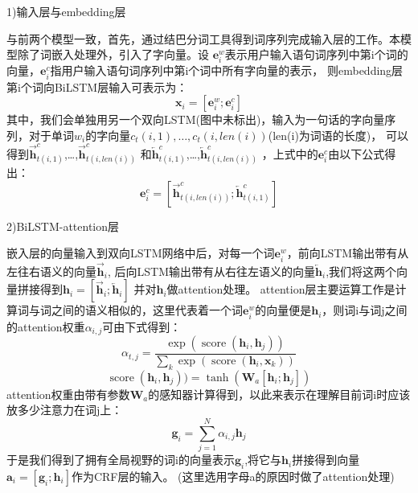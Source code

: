 1)输入层与embedding层

与前两个模型一致，首先，通过结巴分词工具得到词序列完成输入层的工作。本模型除了词嵌入处理外，引入了字向量。设
$\mathbf{e}_{i}^{w}$表示用户输入语句词序列中第i个词的向量，$\mathbf{e}_{i}^{c}$指用户输入语句词序列中第i个词中所有字向量的表示，
则embedding层第i个词向BiLSTM层输入可表示为：
\begin{equation}
  \mathbf{x}_{i}=[\mathbf{e}_{i}^{w} ;\mathbf{e}_{i}^{c}]
\end{equation}
其中，我们会单独用另一个双向LSTM(图中未标出)，输入为一句话的字向量序列，对于单词$w_i$的字向量$c_t(i,1),\dots,c_t(i,len(i))$(len(i)为词语的长度)，
可以得到$\overrightarrow{\mathbf{h}}_{t(i, 1)}^{c}$,\dots,$\overrightarrow{\mathbf{h}}_{t(i, len(i))}^{c}$
和$\overleftarrow{\mathbf{h}}_{t(i, 1)}^{c}$,\dots,$\overleftarrow{\mathbf{h}}_{t(i, len(i))}^{c}$ ，上式中的$\mathbf{e}_{i}^{c}$由以下公式得出：
\begin{equation}
  \mathbf{e}_{i}^{c}=[\overrightarrow{\mathbf{h}}_{t(i, len(i))}^{c} ; \overleftarrow{\mathbf{h}}_{t(i, 1)}^{c}]
\end{equation}

2)BiLSTM-attention层

嵌入层的向量输入到双向LSTM网络中后，对每一个词$\mathbf{e}_{i}^{w}$，前向LSTM输出带有从左往右语义的向量$\overrightarrow{\mathbf{h}}_{i}$,
后向LSTM输出带有从右往左语义的向量$\overleftarrow{\mathbf{h}}_{i}$,我们将这两个向量拼接得到$\mathbf{h}_{i}=[\overrightarrow{\mathbf{h}}_{i} ;\overleftarrow{\mathbf{h}}_{i}]$
并对$\mathbf{h}_{i}$做attention处理。
attention层主要运算工作是计算词与词之间的语义相似的，这里代表着一个词$\mathbf{e}_{i}^{w}$的向量便是$\mathbf{h}_{i}$，则词i与词j之间的attention权重$α_{i,j}$可由下式得到：
\begin{equation}
\alpha_{t, j}=\frac{\exp \left(\operatorname{score}\left(\mathbf{h}_{i}, \mathbf{h}_{j}\right)\right)}{\sum_{k} \exp \left(\operatorname{score}\left(\mathbf{h}_{i}, \mathbf{x}_{k}\right)\right)}
\end{equation}
\begin{equation}
  \operatorname{score}(\mathbf{h}_{i}, \mathbf{h}_{j}))=\tanh \left(\mathbf{W}_{a}\left[\mathbf{h}_{i} ; \mathbf{h}_{j}\right]\right)
\end{equation}
attention权重由带有参数$\mathbf{W}_{a}$的感知器计算得到，以此来表示在理解目前词i时应该放多少注意力在词j上：
\begin{equation}
  \mathbf{g}_{i}=\sum_{j=1}^{N} \alpha_{i, j} \mathbf{h}_{j}
\end{equation}
于是我们得到了拥有全局视野的词i的向量表示$\mathbf{g}_{i}$,将它与$\mathbf{h}_{i}$拼接得到向量$\mathbf{a}_{i}=[\mathbf{g}_{i} ;\mathbf{h}_{i}]$作为CRF层的输入。
(这里选用字母a的原因时做了attention处理)

